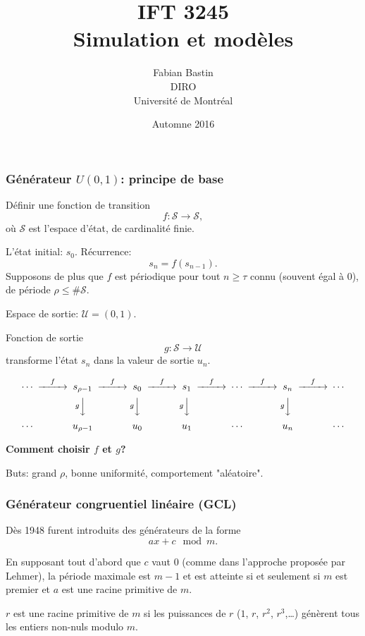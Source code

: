 \documentclass[t,usepdftitle=false]{beamer}
\title[IFT3245]{IFT 3245\\Simulation et modèles}
\author[Fabian Bastin]{Fabian Bastin\\DIRO\\Université de Montréal}
\date{Automne 2016}
\def\cS{\mathcal{S}}
\begin{document}
\frame{\titlepage}

\begin{frame}
\frametitle{Générateur $U(0,1)$: principe de base}

Définir une fonction de transition \[
f: \mathcal{S} \rightarrow \mathcal{S},\]
où $\mathcal{S}$ est l'espace d'état, de cardinalité
finie.

\mbox{}

L'état initial: $s_0$. Récurrence:
\[
s_n = f(s_{n-1}).
\]
Supposons de plus que $f$ est périodique pour tout $n \geq \tau$ connu (souvent égal à 0), de période $\rho \leq \# \cS$.

\mbox{}

Espace de sortie: $\mathcal{U} = (0,1)$.

\mbox{}

Fonction de sortie
\[
g: \mathcal{S} \rightarrow \mathcal{U}
\]
transforme l'état $s_n$ dans la valeur de sortie $u_n$.

\end{frame}

\begin{frame}

\[
\begin{CD}
 \cdots @>f>> s_{\rho-1} @>f>> s_0 @>f>> s_1  @>f>> 
  \cdots @>f>> s_n @>f>> \cdots \\ 
%
  @. @V{g}VV  @V{g}VV   @V{g}VV   
  @.  @V{g}VV  \\
%
 \cdots @. u_{\rho-1} @. u_0
 @.  u_1  @.   \cdots @.  u_n @.  \cdots \\
\end{CD}
\]
\label{fig:rng}

\mbox{}

{\bf Comment choisir $f$ et $g$?}

\mbox{}

Buts: grand $\rho$, bonne uniformité, comportement "aléatoire".

\end{frame}

\begin{frame}
\frametitle{Générateur congruentiel linéaire (GCL)}

Dès 1948 furent introduits des générateurs de la forme
\[
ax + c\mod m.
\]

En supposant tout d'abord que $c$ vaut 0 (comme dans l'approche proposée par Lehmer), la période maximale est $m-1$ et est atteinte si et seulement si $m$ est premier et $a$ est
une racine primitive de $m$.

\mbox{}

$r$ est une racine primitive de $m$ si les puissances de $r$ ($1$, $r$,
$r^2$, $r^3$,\ldots) génèrent tous les entiers non-nuls modulo $m$.

\end{frame}
\end{document}
